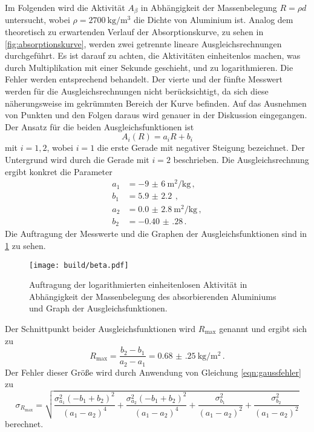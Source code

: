 Im Folgenden wird die Aktivität $A_\beta$ in Abhängigkeit der Massenbelegung $R = \rho d$
untersucht, wobei $\rho = \SI{2700}{\kilo\gram\per\meter\cubed}$ die Dichte von Aluminium ist.
Analog dem theoretisch zu erwartenden Verlauf der Absorptionskurve, zu sehen in \ref{fig:absorptionskurve},
werden zwei getrennte lineare Ausgleichsrechnungen durchgeführt. Es ist darauf zu achten, die Aktivitäten
einheitenlos machen, was durch Multiplikation mit einer Sekunde geschieht, und zu logarithmieren. Die Fehler werden entsprechend behandelt. Der vierte und der fünfte Messwert
werden für die Ausgleichsrechnungen nicht berücksichtigt, da sich diese näherungsweise im gekrümmten Bereich
der Kurve befinden. Auf das Ausnehmen von Punkten und den Folgen daraus wird genauer in der Diskussion eingegangen.
Der Ansatz für die beiden Ausgleichsfunktionen ist
\begin{equation*}
  A_i(R) = a_i R + b_i
\end{equation*}
mit $i=1{,}2$, wobei $i=1$ die erste Gerade mit negativer Steigung bezeichnet. Der Untergrund
wird durch die Gerade mit $i=2$ beschrieben.
Die Ausgleichsrechnung ergibt konkret die Parameter
\begin{align*}
  a_1 &= \SI{-9(6)}{\meter\squared\per\kilo\gram}\,,\\
  b_1 &= \SI{5.9(22)}{}\,,\\
  a_2 &= \SI{0.0(28)}{\meter\squared\per\kilo\gram}\,,\\
  b_2 &= \SI{-0.40(28)}\,.
\end{align*}
Die Auftragung der Messwerte und die Graphen der Ausgleichsfunktionen sind in \ref{fig:beta} zu sehen.
\begin{figure}
  \centering
  \texttt{[image: build/beta.pdf]}
  \caption{Auftragung der logarithmierten einheitenlosen Aktivität in Abhängigkeit der Massenbelegung des absorbierenden Aluminiums und Graph der Ausgleichsfunktionen.}
  \label{fig:beta}
\end{figure}
Der Schnittpunkt beider Ausgleichsfunktionen wird $R_\text{max}$ genannt und ergibt sich zu
\begin{equation*}
  R_\text{max} = \frac{b_2-b_1}{a_2-a_1} = \SI{0.68(25)}{\kilo\gram\per\meter\squared}\,.
\end{equation*}
Der Fehler dieser Größe wird durch Anwendung von Gleichung \eqref{eqn:gaussfehler}
zu
\begin{equation*}
  \sigma_{R_\text{max}} =
  \sqrt{\frac{\sigma_{a_{1}}^{2} \left(- b_{1} + b_{2}\right)^{2}}{\left(a_{1} - a_{2}\right)^{4}}
  + \frac{\sigma_{a_{2}}^{2} \left(- b_{1} + b_{2}\right)^{2}}{\left(a_{1} - a_{2}\right)^{4}}
  + \frac{\sigma_{b_{1}}^{2}}{\left(a_{1} - a_{2}\right)^{2}} + \frac{\sigma_{b_{2}}^{2}}{\left(a_{1} - a_{2}\right)^{2}}}
\end{equation*}
berechnet.

